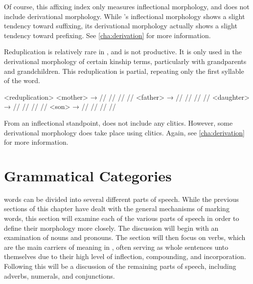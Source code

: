 Of course, this affixing index only measures inflectional morphology, and does not include derivational morphology. While \lang{}'s inflectional morphology shows a slight tendency toward suffixing, its derivational morphology actually shows a slight tendency toward prefixing. See \autoref{cha:derivation} for more information.

Reduplication is relatively rare in \lang{}, and is not productive. It is only used in the derivational morphology of certain kinship terms, particularly with grandparents and grandchildren. This reduplication is partial\autocite{wals-27}, repeating only the first syllable of the word.

\pex<reduplication>
	\a<mother>\begingl
		\gla {} → //
		\glb {} {} //
		\glb {} {} //
		\glb {} {} //
	\endgl
	\a<father>\begingl
		\gla {} → //
		\glb {} {} //
		\glb {} {} //
		\glb {} {} //
	\endgl
	\a<daughter>\begingl
		\gla {} → //
		\glb {} {} //
		\glb {} {} //
		\glb {} {} //
	\endgl
	\a<son>\begingl
		\gla {} → //
		\glb {} {} //
		\glb {} {} //
		\glb {} {} //
	\endgl
\xe

From an inflectional standpoint, \lang{} does not include any clitics. However, some derivational morphology does take place using clitics. Again, see \autoref{cha:derivation} for more information.

\section{Grammatical Categories}
\label{sec:gram-cats}

\lang{} words can be divided into several different parts of speech. While the previous sections of this chapter have dealt with the general mechanisms of marking words, this section will examine each of the various parts of speech in order to define their morphology more closely. The discussion will begin with an examination of nouns and pronouns. The section will then focus on verbs, which are the main carriers of meaning in \lang{}, often serving as whole sentences unto themselves due to their high level of inflection, compounding, and incorporation. Following this will be a discussion of the remaining parts of speech, including adverbs, numerals, and conjunctions.

